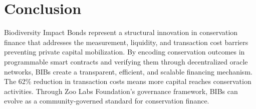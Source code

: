 \documentclass[11pt,a4paper]{article}
\begin{document}
\section{Conclusion}
\label{sec:conclusion}

Biodiversity Impact Bonds represent a structural innovation in
conservation finance that addresses the measurement, liquidity, and
transaction cost barriers preventing private capital mobilization. By
encoding conservation outcomes in programmable smart contracts and
verifying them through decentralized oracle networks, BIBs create a
transparent, efficient, and scalable financing mechanism. The 62\%
reduction in transaction costs means more capital reaches conservation
activities. Through Zoo Labs Foundation's governance framework, BIBs
can evolve as a community-governed standard for conservation finance.




\end{document}
